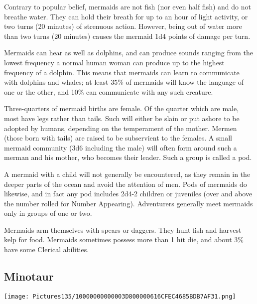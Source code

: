 \documentclass[a4paper,twoside,openany,10pt]{book}
\begin{document}
\begin{multicols}{2}
Contrary to popular belief, mermaids are not fish (nor even half fish) and do not breathe water. They can hold their breath for up to an hour of light activity, or two turns (20 minutes) of strenuous action. However, being out of water more than two turns (20 minutes) causes the mermaid 1d4 points of damage per turn.

Mermaids can hear as well as dolphins, and can produce sounds ranging from the lowest frequency a normal human woman can produce up to the highest frequency of a dolphin. This means that mermaids can learn to communicate with dolphins and whales; at least 35\% of mermaids will know the language of one or the other, and 10\% can communicate with any such creature.

Three-quarters of mermaid births are female. Of the quarter which are male, most have legs rather than tails. Such will either be slain or put ashore to be adopted by humans, depending on the temperament of the mother. Mermen (those born with tails) are raised to be subservient to the females. A small mermaid community (3d6 including the male) will often form around such a merman and his mother, who becomes their leader. Such a group is called a pod.

A mermaid with a child will not generally be encountered, as they remain in the deeper parts of the ocean and avoid the attention of men. Pods of mermaids do likewise, and in fact any pod includes 2d4-2 children or juveniles (over and above the number rolled for Number Appearing). Adventurers generally meet mermaids only in groups of one or two.

Mermaids arm themselves with spears or daggers. They hunt fish and harvest kelp for food. Mermaids sometimes possess more than 1 hit die, and about 3\% have some Clerical abilities.

\subsection*{Minotaur}\label{minotaur}


\begin{center} \texttt{[image: Pictures135/10000000000003D800000616CFEC4685BDB7AF31.png]} \end{center}


\end{multicols}
\end{document}
